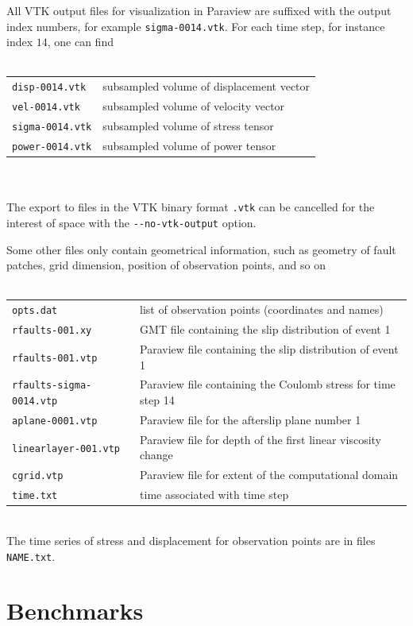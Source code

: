 \documentclass[10pt]{article}
\begin{document}
All VTK output files for visualization in Paraview are suffixed with the output index numbers, for example \verb'sigma-0014.vtk'. For each time step, for instance index $14$, one can find\\
\\
\begin{tabular}{ll}
\verb'disp-0014.vtk' & subsampled volume of displacement vector\\
\verb'vel-0014.vtk' & subsampled volume of velocity vector\\
\verb'sigma-0014.vtk' & subsampled volume of stress tensor\\
\verb'power-0014.vtk' & subsampled volume of power tensor\\
\end{tabular}\\
\\
The export to files in the VTK binary format \verb'.vtk' can be cancelled for the interest of space with the \verb'--no-vtk-output' option.

Some other files only contain geometrical information, such as geometry of fault patches, grid dimension, position of observation points, and so on\\
\\
\begin{tabular}{ll}
\verb'opts.dat' & list of observation points (coordinates and names)\\
\verb'rfaults-001.xy' & GMT file containing the slip distribution of event 1\\
\verb'rfaults-001.vtp' & Paraview file containing the slip distribution of event 1\\
\verb'rfaults-sigma-0014.vtp' & Paraview file containing the Coulomb stress for time step 14\\
\verb'aplane-0001.vtp' & Paraview file for the afterslip plane number 1\\
\verb'linearlayer-001.vtp' & Paraview file for depth of the first linear viscosity change\\
\verb'cgrid.vtp' & Paraview file for extent of the computational domain\\
\verb'time.txt' &  time associated with time step\\
\end{tabular}\\

The time series of stress and displacement for observation points are in files \verb'NAME.txt'.

\section{Benchmarks}
\end{document}
